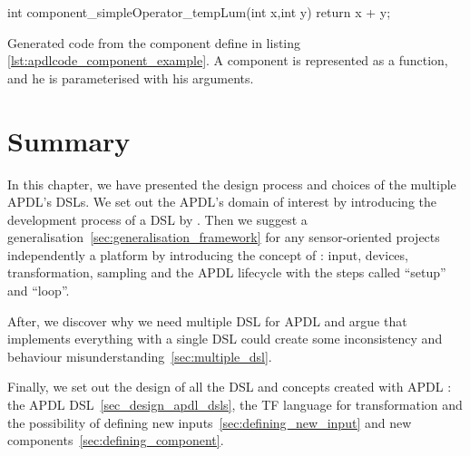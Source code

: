 \begin{listing}[H]
  \centering
\begin{cppcode}
int component_simpleOperator_tempLum(int x,int y) {
  return x + y;
}
\end{cppcode}
  \caption[Generated code for an \gls{APDL}’s component]{Generated code from the
component define in listing \ref{lst:apdlcode_component_example}. A component is
represented as a function, and he is parameterised with his arguments.}
  \label{lst:component_generated}
\end{listing}

\section{Summary}
\label{sec:design_summary}

In this chapter, we have presented the design process and choices of the multiple
\gls{APDL}’s \gls{DSL}s. We set out the \gls{APDL}’s domain of interest by
introducing the development process of a \gls{DSL} by
\cite{little_languages_little_maintenance}. Then we suggest a
generalisation~\ref{sec:generalisation_framework} for any sensor-oriented
projects independently a platform by introducing the concept of : input, devices,
transformation, sampling and the \gls{APDL} lifecycle with the steps called
``setup'' and ``loop''.

After, we discover why we need multiple \gls{DSL} for \gls{APDL} and argue that
implements everything with a single \gls{DSL} could create some inconsistency
and behaviour misunderstanding~\ref{sec:multiple_dsl}.

Finally, we set out the design of all the \gls{DSL} and concepts created with
\gls{APDL} : the \gls{APDL} \gls{DSL}~\ref{sec_design_apdl_dsls}, the \gls{TF}
language for transformation and the possibility of defining new
inputs~\ref{sec:defining_new_input} and new
components~\ref{sec:defining_component}.

